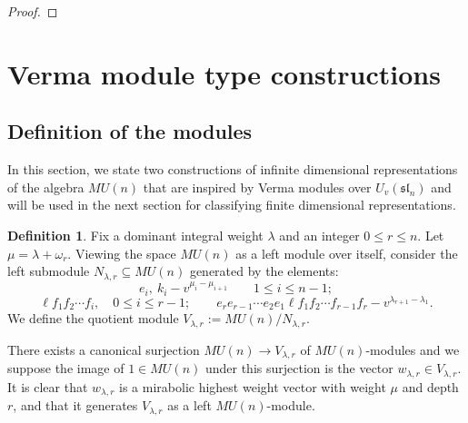 \documentclass{amsart}
\numberwithin{equation}{section}
\theoremstyle{theorem}
\theoremstyle{definition}
\newtheorem{definition}[theorem]{Definition}
\newcommand{\sub}{\subseteq}
\newcommand{\sll}{\mathfrak{sl}}
\newcommand{\uvsln}{U_v(\sll_n)}
\begin{document}
\begin{proof}

\end{proof}

\section{Verma module type constructions} \label{sec:Verma}

\subsection{Definition of the modules}

In this section, we state two constructions of infinite dimensional representations of the algebra $MU(n)$ that are inspired by Verma modules over $\uvsln$ and will be used in the next section for classifying finite dimensional representations.

\begin{definition}Fix a dominant integral weight $\lambda$ and an integer $0\leq r\leq n$. Let $\mu=\lambda+\omega_r$. Viewing the space $MU(n)$ as a left module over itself, consider the left submodule $N_{\lambda, r}\sub MU(n)$ generated by the elements:
\[e_i,~k_i -v^{\mu_i-\mu_{i+1}}\qquad 1\leq i\leq n-1;\]
\[\ell f_1f_2\cdots f_{i},\quad0\leq i\leq r-1;\qquad e_{r}e_{r - 1}\cdots e_2e_1 \ell f_1 f_2\cdots f_{r-1} f_{r}-v^{\lambda_{r+1}-\lambda_1}.\]
We define the quotient module $V_{\lambda, r}:=MU(n)/N_{\lambda, r}$.
\end{definition}
There exists a canonical surjection $MU(n)\to V_{\lambda, r}$ of $MU(n)$-modules and we suppose the image of $1\in MU(n)$ under this surjection is the vector $w_{\lambda, r}\in V_{\lambda, r}$. It is clear that $w_{\lambda, r}$ is a mirabolic highest weight vector with weight $\mu$ and depth $r$, and that it generates $V_{\lambda, r}$ as a left $MU(n)$-module.
\end{document}
